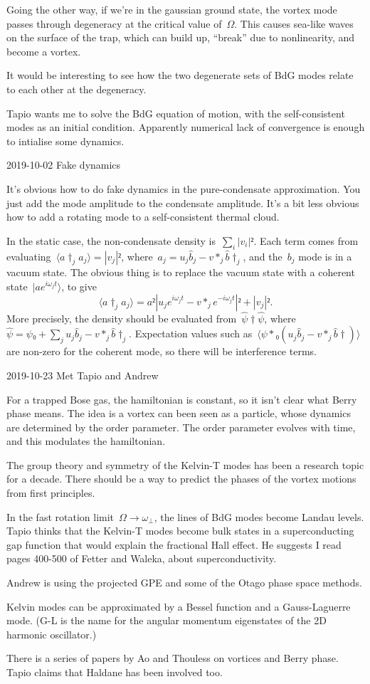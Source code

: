 Going the other way, if we're in the gaussian ground state, the vortex mode passes through degeneracy at the critical value of~$Ω$.  This causes sea-like waves on the surface of the trap, which can build up, “break” due to nonlinearity, and become a vortex.

It would be interesting to see how the two degenerate sets of BdG modes relate to each other at the degeneracy.

Tapio wants me to solve the BdG equation of motion, with the self-consistent modes as an initial condition.  Apparently numerical lack of convergence is enough to intialise some dynamics.

2019-10-02 Fake dynamics

It's obvious how to do fake dynamics in the pure-condensate approximation.  You just add the mode amplitude to the condensate amplitude.  It's a bit less obvious how to add a rotating mode to a self-consistent thermal cloud.

In the static case, the non-condensate density is~$∑_i|v_i|²$.  Each term comes from evaluating~$〈a†_ja_j〉=|v_j|²$, where~$a_j=u_j\hat b_j-v*_j\hat b†_j$, and the~$b_j$ mode is in a vacuum state.  The obvious thing is to replace the vacuum state with a coherent state~$|ae^{iω_jt}〉$, to give
$$〈a†_ja_j〉=a²|u_je^{iω_jt}-v*_je^{-iω_jt}|²+|v_j|².$$
More precisely, the density should be evaluated from~$\hat ψ†\hat ψ$, where~$\hat ψ=ψ₀+∑_ju_j\hat b_j-v*_j\hat b†_j$.  Expectation values such as~$〈ψ*₀(u_j\hat b_j-v*_j\hat b†)〉$ are non-zero for the coherent mode, so there will be interference terms.

2019-10-23 Met Tapio and Andrew

For a trapped Bose gas, the hamiltonian is constant, so it isn't clear what Berry phase means.  The idea is a vortex can been seen as a particle, whose dynamics are determined by the order parameter.  The order parameter evolves with time, and this modulates the hamiltonian.

The group theory and symmetry of the Kelvin-T modes has been a research topic for a decade.  There should be a way to predict the phases of the vortex motions from first principles.

In the fast rotation limit~$Ω→ω_\perp$, the lines of BdG modes become Landau levels.  Tapio thinks that the Kelvin-T modes become bulk states in a superconducting gap function that would explain the fractional Hall effect.  He suggests I read pages 400-500 of Fetter and Waleka, about superconductivity.

Andrew is using the projected GPE and some of the Otago phase space methods.

Kelvin modes can be approximated by a Bessel function and a Gauss-Laguerre mode.  (G-L is the name for the angular momentum eigenstates of the 2D harmonic oscillator.)

There is a series of papers by Ao and Thouless on vortices and Berry phase.  Tapio claims that Haldane has been involved too.

\bye